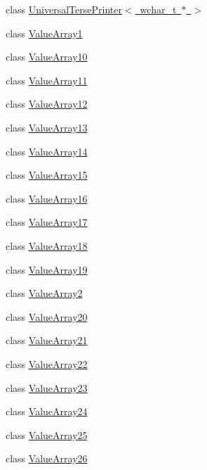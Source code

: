 \begin{DoxyCompactItemize}
\item 
class \mbox{\hyperlink{classtesting_1_1internal_1_1UniversalTersePrinter_3_01wchar__t_01_5_01_4}{Universal\+Terse\+Printer$<$ wchar\+\_\+t $\ast$ $>$}}
\item 
class \mbox{\hyperlink{classtesting_1_1internal_1_1ValueArray1}{Value\+Array1}}
\item 
class \mbox{\hyperlink{classtesting_1_1internal_1_1ValueArray10}{Value\+Array10}}
\item 
class \mbox{\hyperlink{classtesting_1_1internal_1_1ValueArray11}{Value\+Array11}}
\item 
class \mbox{\hyperlink{classtesting_1_1internal_1_1ValueArray12}{Value\+Array12}}
\item 
class \mbox{\hyperlink{classtesting_1_1internal_1_1ValueArray13}{Value\+Array13}}
\item 
class \mbox{\hyperlink{classtesting_1_1internal_1_1ValueArray14}{Value\+Array14}}
\item 
class \mbox{\hyperlink{classtesting_1_1internal_1_1ValueArray15}{Value\+Array15}}
\item 
class \mbox{\hyperlink{classtesting_1_1internal_1_1ValueArray16}{Value\+Array16}}
\item 
class \mbox{\hyperlink{classtesting_1_1internal_1_1ValueArray17}{Value\+Array17}}
\item 
class \mbox{\hyperlink{classtesting_1_1internal_1_1ValueArray18}{Value\+Array18}}
\item 
class \mbox{\hyperlink{classtesting_1_1internal_1_1ValueArray19}{Value\+Array19}}
\item 
class \mbox{\hyperlink{classtesting_1_1internal_1_1ValueArray2}{Value\+Array2}}
\item 
class \mbox{\hyperlink{classtesting_1_1internal_1_1ValueArray20}{Value\+Array20}}
\item 
class \mbox{\hyperlink{classtesting_1_1internal_1_1ValueArray21}{Value\+Array21}}
\item 
class \mbox{\hyperlink{classtesting_1_1internal_1_1ValueArray22}{Value\+Array22}}
\item 
class \mbox{\hyperlink{classtesting_1_1internal_1_1ValueArray23}{Value\+Array23}}
\item 
class \mbox{\hyperlink{classtesting_1_1internal_1_1ValueArray24}{Value\+Array24}}
\item 
class \mbox{\hyperlink{classtesting_1_1internal_1_1ValueArray25}{Value\+Array25}}
\item 
class \mbox{\hyperlink{classtesting_1_1internal_1_1ValueArray26}{Value\+Array26}}

\end{DoxyCompactItemize}
